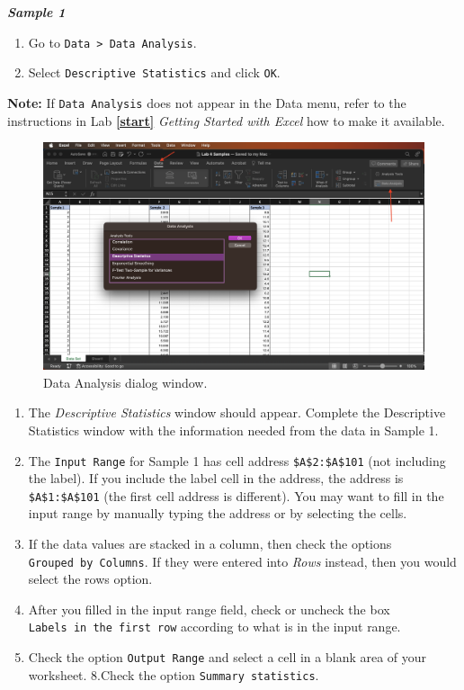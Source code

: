 \documentclass[
]{book}
\providecommand{\tightlist}{%
  \setlength{\itemsep}{0pt}\setlength{\parskip}{0pt}}
\begin{document}
\textbf{\emph{Sample 1}}

\begin{enumerate}
\def\labelenumi{\arabic{enumi}.}
\tightlist
\item
  Go to \texttt{Data\ \textgreater{}\ Data\ Analysis}.
\item
  Select \texttt{Descriptive\ Statistics} and click \texttt{OK}.
\end{enumerate}

\textbf{Note:} If \texttt{Data\ Analysis} does not appear in the Data menu, refer to the instructions in Lab \textbf{\ref{start}} \emph{Getting Started with Excel} how to make it available.

\begin{figure}

{\centering \includegraphics[width=0.8\linewidth]{descriptive-stats1} 

}

\caption{Data Analysis dialog window.}\label{fig:descriptive-stats1}
\end{figure}

\begin{enumerate}
\def\labelenumi{\arabic{enumi}.}
\setcounter{enumi}{2}
\tightlist
\item
  The \emph{Descriptive Statistics} window should appear. Complete the Descriptive Statistics window with the information needed from the data in Sample 1.
\item
  The \texttt{Input\ Range} for Sample 1 has cell address \texttt{\$A\$2:\$A\$101} (not including the label). If you include the label cell in the address, the address is \texttt{\$A\$1:\$A\$101} (the first cell address is different). You may want to fill in the input range by manually typing the address or by selecting the cells.
\item
  If the data values are stacked in a column, then check the options \texttt{Grouped\ by\ Columns}. If they were entered into \emph{Rows} instead, then you would select the rows option.
\item
  After you filled in the input range field, check or uncheck the box \texttt{Labels\ in\ the\ first\ row} according to what is in the input range.
\item
  Check the option \texttt{Output\ Range} and select a cell in a blank area of your worksheet.
  8.Check the option \texttt{Summary\ statistics}.
\end{enumerate}
\end{document}
